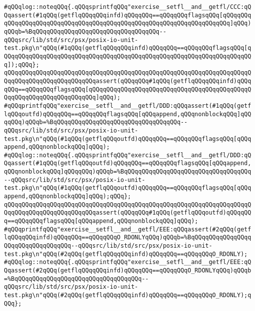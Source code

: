 \verb|#qQQqlog::noteqQQq{.qQQqsprintfqQQq"exercise__setfl__and__getfl/CCC:qQQqassert(#1qQQq(getflqQQqqQQqinfd)qQQqqQQq==qQQqqQQqflagsqQQq[qQQqqQQqqQQqqQQqqQQqqQQqqQQqqQQqqQQqqQQqqQQqqQQqqQQqqQQqqQQqqQQqqQQqqQQq]qQQq)qQQqb=%BqQQqqQQqqQQqqQQqqQQqqQQqqQQqqQQqqQQq--qQQqsrc/lib/std/src/psx/posix-io-unit-test.pkg\n"qQQq(#1qQQq(getflqQQqqQQqinfd)qQQqqQQq==qQQqqQQqflagsqQQq[qQQqqQQqqQQqqQQqqQQqqQQqqQQqqQQqqQQqqQQqqQQqqQQqqQQqqQQqqQQqqQQqqQQqqQQq]);qQQq};|\newline
\verb|qQQqqQQqqQQqqQQqqQQqqQQqqQQqqQQqqQQqqQQqqQQqqQQqqQQqqQQqqQQqqQQqqQQqqQQqqQQqqQQqqQQqqQQqqQQqqQQqassert(qQQqqQQq#1qQQq(getflqQQqqQQqinfd)qQQqqQQq==qQQqqQQqflagsqQQq[qQQqqQQqqQQqqQQqqQQqqQQqqQQqqQQqqQQqqQQqqQQqqQQqqQQqqQQqqQQqqQQqqQQqqQQq]qQQq);|\newline
\verb|#qQQqprintfqQQq"exercise__setfl__and__getfl/DDD:qQQqassert(#1qQQq(getflqQQqoutfd)qQQqqQQq==qQQqqQQqflagsqQQq[qQQqappend,qQQqnonblockqQQq]qQQqqQQq)qQQqb=%BqQQqqQQqqQQqqQQqqQQqqQQqqQQqqQQqqQQq--qQQqsrc/lib/std/src/psx/posix-io-unit-test.pkg\n"qQQq(#1qQQq(getflqQQqoutfd)qQQqqQQq==qQQqqQQqflagsqQQq[qQQqappend,qQQqnonblockqQQq]qQQq);|\newline
\verb|#qQQqlog::noteqQQq{.qQQqsprintfqQQq"exercise__setfl__and__getfl/DDD:qQQqassert(#1qQQq(getflqQQqoutfd)qQQqqQQq==qQQqqQQqflagsqQQq[qQQqappend,qQQqnonblockqQQq]qQQqqQQq)qQQqb=%BqQQqqQQqqQQqqQQqqQQqqQQqqQQqqQQqqQQq--qQQqsrc/lib/std/src/psx/posix-io-unit-test.pkg\n"qQQq(#1qQQq(getflqQQqoutfd)qQQqqQQq==qQQqqQQqflagsqQQq[qQQqappend,qQQqnonblockqQQq]qQQq);qQQq};|\newline
\verb|qQQqqQQqqQQqqQQqqQQqqQQqqQQqqQQqqQQqqQQqqQQqqQQqqQQqqQQqqQQqqQQqqQQqqQQqqQQqqQQqqQQqqQQqqQQqqQQqassert(qQQqqQQq#1qQQq(getflqQQqoutfd)qQQqqQQq==qQQqqQQqflagsqQQq[qQQqappend,qQQqnonblockqQQq]qQQq);|\newline
\newline
\newline
\verb|#qQQqprintfqQQq"exercise__setfl__and__getfl/EEE:qQQqassert(#2qQQq(getflqQQqqQQqinfd)qQQqqQQq==qQQqqQQqO_RDONLYqQQq)qQQqb=%BqQQqqQQqqQQqqQQqqQQqqQQqqQQqqQQqqQQq--qQQqsrc/lib/std/src/psx/posix-io-unit-test.pkg\n"qQQq(#2qQQq(getflqQQqqQQqinfd)qQQqqQQq==qQQqqQQqO_RDONLY);|\newline
\verb|#qQQqlog::noteqQQq{.qQQqsprintfqQQq"exercise__setfl__and__getfl/EEE:qQQqassert(#2qQQq(getflqQQqqQQqinfd)qQQqqQQq==qQQqqQQqO_RDONLYqQQq)qQQqb=%BqQQqqQQqqQQqqQQqqQQqqQQqqQQqqQQqqQQq--qQQqsrc/lib/std/src/psx/posix-io-unit-test.pkg\n"qQQq(#2qQQq(getflqQQqqQQqinfd)qQQqqQQq==qQQqqQQqO_RDONLY);qQQq};|\newline
